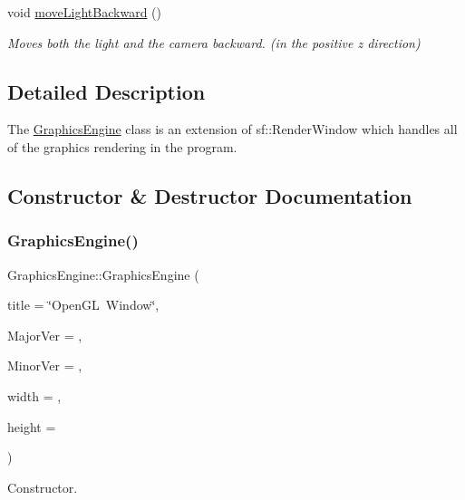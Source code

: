 \begin{DoxyCompactItemize}
\mbox{\label{class_graphics_engine_a080748968345f97e6d6e999a81b45b33}} 
void \hyperlink{class_graphics_engine_a080748968345f97e6d6e999a81b45b33}{move\+Light\+Backward} ()
\begin{DoxyCompactList}\small\item\em Moves both the light and the camera backward. (in the positive z direction) \end{DoxyCompactList}\end{DoxyCompactItemize}


\subsection{Detailed Description}
The \hyperlink{class_graphics_engine}{Graphics\+Engine} class is an extension of sf\+::\+Render\+Window which handles all of the graphics rendering in the program. 

\subsection{Constructor \& Destructor Documentation}
\mbox{\label{class_graphics_engine_a458fa2b36f864e0820a0a54ad58ff1c3}} 
\subsubsection{\texorpdfstring{Graphics\+Engine()}{GraphicsEngine()}}
{\footnotesize\ttfamily Graphics\+Engine\+::\+Graphics\+Engine (\begin{DoxyParamCaption}\item[{std\+::string}]{title = {\ttfamily \char`\"{}OpenGL~Window\char`\"{}},  }\item[{G\+Lint}]{Major\+Ver = {},  }\item[{G\+Lint}]{Minor\+Ver = {},  }\item[{int}]{width = {},  }\item[{int}]{height = {} }\end{DoxyParamCaption})}



Constructor. 


